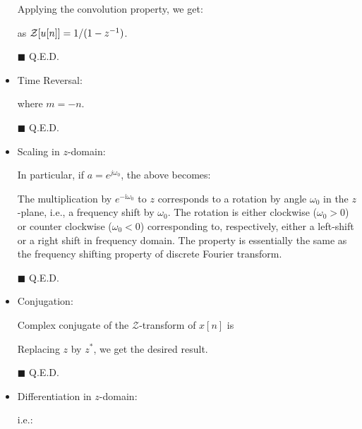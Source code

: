 \begin{itemize}
\begin{dem}
		Applying the convolution property, we get:
		
		as ${\cal Z}[u[n]]=1/(1-z^{-1})$.
		\begin{flushright}
			$\blacksquare$  Q.E.D.
		\end{flushright}
		\end{dem}
		
		\item Time Reversal:
		
		\begin{dem}
		
		where $m=-n$.
		\begin{flushright}
			$\blacksquare$  Q.E.D.
		\end{flushright}
		\end{dem}
		
		\item Scaling in $z$-domain:
		
		
		\begin{dem}
		
		In particular, if $a=e^{j\omega_0}$, the above becomes:
		
		The multiplication by $e^{-\mathrm{i}\omega_0}$ to $z$ corresponds to a rotation by  angle $\omega_0$ in the $z$-plane, i.e., a frequency shift by $\omega_0$. The rotation is either clockwise ($\omega_0>0$) or counter clockwise ($\omega_0<0$) corresponding to, respectively, either a left-shift or a right shift in frequency domain. The property is essentially the same as the frequency shifting property of discrete Fourier transform.
		\begin{flushright}
			$\blacksquare$  Q.E.D.
		\end{flushright} 
		\end{dem}
		
		\item Conjugation:
		
		\begin{dem}
		Complex conjugate of the $\mathcal{Z}$-transform of $x[n]$ is
		
		Replacing $z$ by $z^*$, we get the desired result.
		\begin{flushright}
			$\blacksquare$  Q.E.D.
		\end{flushright}
		\end{dem}
		
		\item Differentiation in $z$-domain:
		
		\begin{dem}
		
		i.e.:
		

\end{dem}
\end{itemize}
